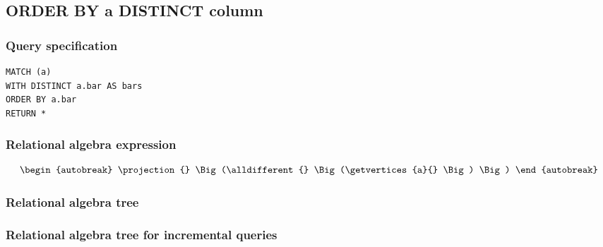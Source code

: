 \subsection{ORDER BY a DISTINCT column}

\subsubsection*{Query specification}

\begin{lstlisting}
MATCH (a)
WITH DISTINCT a.bar AS bars
ORDER BY a.bar
RETURN *
\end{lstlisting}

\subsubsection*{Relational algebra expression}

\begin{align*}
\begin{autobreak}
\projection{} \Big(\alldifferent{} \Big(\getvertices{a}{}
\Big)
\Big)
\end{autobreak}
\end{align*}

\subsubsection*{Relational algebra tree}


\subsubsection*{Relational algebra tree for incremental queries}


